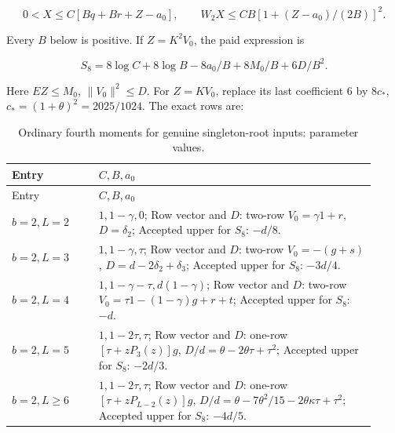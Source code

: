 \[
 0<X\le C[Bq+Br+Z-a_0],\qquad
 W_2X\le CB[1+(Z-a_0)/(2B)]^2.
 \tag{Q87.4.1}\label{eq:Q87:4.1}
\]

Every \(B\) below is positive. If \(Z=\allowbreak K^2V_0\), the
paid expression is

\[
 S_8=8\log C+8\log B-8a_0/B+8M_0/B+6D/B^2.
 \tag{Q87.4.2}\label{eq:Q87:4.2}
\]

Here \(EZ\le\allowbreak  M_0\), \(\|V_0\|^2\le\allowbreak  D\). For \(Z=\allowbreak KV_0\),
replace its last coefficient 6 by \(8c_*\),
\(c_*=\allowbreak (1+\theta)^2=\allowbreak 2025/1024\). The exact rows are:


\begingroup\small
\setlength{\tabcolsep}{3pt}
\setlength{\LTleft}{0pt}\setlength{\LTright}{\fill}
\begin{longtable}{@{}p{0.2200\linewidth}p{0.7000\linewidth}@{}}
\caption{Ordinary fourth moments for genuine singleton-root inputs: parameter values.}\label{tab:parameters:q5-c087:2}\\
\toprule
Entry & \(C,\allowbreak  B,\allowbreak  a_0\) \\
\midrule\endfirsthead
\toprule
Entry & \(C,\allowbreak  B,\allowbreak  a_0\) \\
\midrule\endhead
\bottomrule\endfoot
\(b=\allowbreak 2,\allowbreak  L=\allowbreak 2\) & \(1,\allowbreak  1-\gamma,\allowbreak  0\); Row vector and \(D\): two-row \(V_0=\allowbreak \gamma1+r\), \(D=\allowbreak \delta_2\); Accepted upper for \(S_8\): \(-d/8\). \\
\addlinespace[2pt]
\(b=\allowbreak 2,\allowbreak  L=\allowbreak 3\) & \(1,\allowbreak  1-\gamma,\allowbreak  \tau\); Row vector and \(D\): two-row \(V_0=\allowbreak -(g+s)\), \(D=\allowbreak d-2\delta_2+\delta_3\); Accepted upper for \(S_8\): \(-3d/4\). \\
\addlinespace[2pt]
\(b=\allowbreak 2,\allowbreak  L=\allowbreak 4\) & \(1,\allowbreak  1-\gamma-\tau,\allowbreak  d(1-\gamma)\); Row vector and \(D\): two-row \(V_0=\allowbreak \tau1-(1-\gamma)g+r+t\); Accepted upper for \(S_8\): \(-d\). \\
\addlinespace[2pt]
\(b=\allowbreak 2,\allowbreak  L=\allowbreak 5\) & \(1,\allowbreak  1-2\tau,\allowbreak  \tau\); Row vector and \(D\): one-row \([\tau+zP_3(z)]g\), \(D/d=\allowbreak \theta-2\theta\tau+\tau^2\); Accepted upper for \(S_8\): \(-2d/3\). \\
\addlinespace[2pt]
\(b=\allowbreak 2,\allowbreak  L\ge\allowbreak 6\) & \(1,\allowbreak  1-2\tau,\allowbreak  \tau\); Row vector and \(D\): one-row \([\tau+zP_{L-2}(z)]g\), \(D/d=\allowbreak \theta-7\theta^2/15-2\theta\kappa\tau+\tau^2\); Accepted upper for \(S_8\): \(-4d/5\). \\

\end{longtable}
